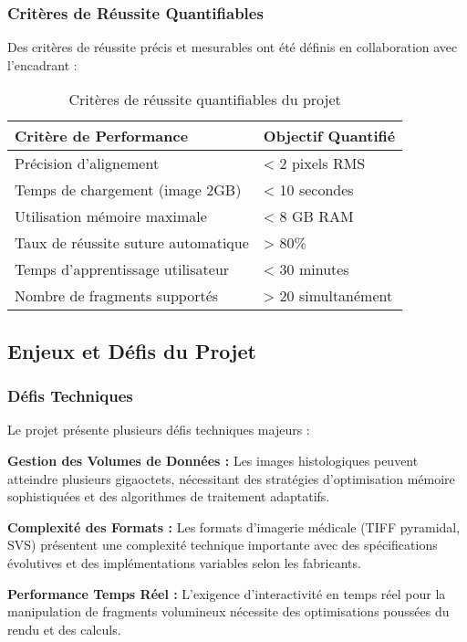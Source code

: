 \documentclass[12pt,a4paper]{article}
\begin{document}
\subsubsection{Critères de Réussite Quantifiables}

Des critères de réussite précis et mesurables ont été définis en collaboration avec l'encadrant :

\begin{table}[h]
\centering
\begin{tabular}{|p{6cm}|p{4cm}|}
\hline
\textbf{Critère de Performance} & \textbf{Objectif Quantifié} \\
\hline
Précision d'alignement & < 2 pixels RMS \\
\hline
Temps de chargement (image 2GB) & < 10 secondes \\
\hline
Utilisation mémoire maximale & < 8 GB RAM \\
\hline
Taux de réussite suture automatique & > 80\% \\
\hline
Temps d'apprentissage utilisateur & < 30 minutes \\
\hline
Nombre de fragments supportés & > 20 simultanément \\
\hline
\end{tabular}
\caption{Critères de réussite quantifiables du projet}
\end{table}

\subsection{Enjeux et Défis du Projet}

\subsubsection{Défis Techniques}

Le projet présente plusieurs défis techniques majeurs :

\textbf{Gestion des Volumes de Données :} Les images histologiques peuvent atteindre plusieurs gigaoctets, nécessitant des stratégies d'optimisation mémoire sophistiquées et des algorithmes de traitement adaptatifs.

\textbf{Complexité des Formats :} Les formats d'imagerie médicale (TIFF pyramidal, SVS) présentent une complexité technique importante avec des spécifications évolutives et des implémentations variables selon les fabricants.

\textbf{Performance Temps Réel :} L'exigence d'interactivité en temps réel pour la manipulation de fragments volumineux nécessite des optimisations poussées du rendu et des calculs.
\end{document}
